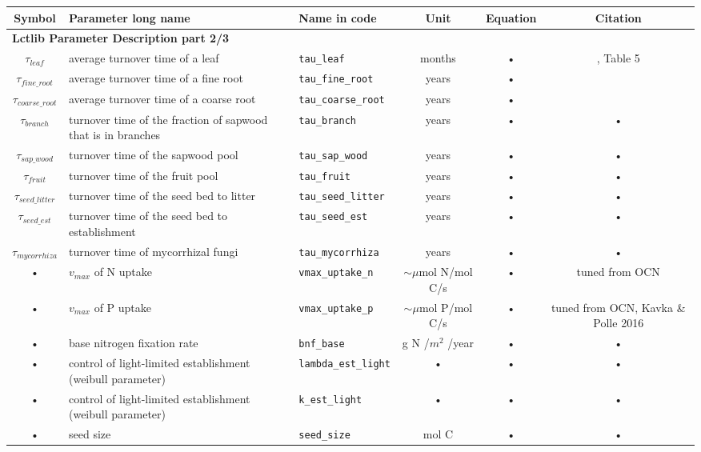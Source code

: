 \begin{table}
\begin{tabularx}{\linewidth}{|c|X|l|c|c|c|} %
\hline 
Symbol & Parameter long name & Name in code & Unit & Equation & Citation \\ 
\hline 

\multicolumn{6}{l}{\bf Lctlib Parameter Description part 2/3}\\
\hline
$\tau_{leaf}$  & average turnover time of a leaf & \texttt{tau\_leaf} & months & • & \cite{Kattge:2011fc}, Table 5 \\
$\tau_{{fine}\_{root}}$ & average turnover time of a fine root & \texttt{tau\_fine\_root} & years & • & \cite{Ahrens:2014gi} \\
$\tau_{{coarse}\_{root}}$ & average turnover time of a coarse root & \texttt{tau\_coarse\_root} & years & • & \cite{Ahrens:2014gi} \\
$\tau_{branch}$ & turnover time of the fraction of sapwood that is in branches & \texttt{tau\_branch} & years & • & • \\
$\tau_{{sap}\_{wood}}$ & turnover time of the sapwood pool & \texttt{tau\_sap\_wood} & years & • & • \\
$\tau_{fruit}$ & turnover time of the fruit pool & \texttt{tau\_fruit} & years & • & • \\
$\tau_{{seed}\_{litter}}$ & turnover time of the seed bed to litter & \texttt{tau\_seed\_litter} & years & • & • \\
$\tau_{{seed}\_{est}}$ & turnover time of the seed bed to establishment & \texttt{tau\_seed\_est} & years & • & • \\
$\tau_{mycorrhiza}$  & turnover time of mycorrhizal fungi & \texttt{tau\_mycorrhiza} & years & • & • \\
 • & $v_{max}$ of N uptake & \texttt{vmax\_uptake\_n} & $\sim\mu$mol N/mol C/s & • & tuned from OCN \\
 • & $v_{max}$ of P uptake & \texttt{vmax\_uptake\_p} & $\sim\mu$mol P/mol C/s & • & tuned from OCN, Kavka \& Polle 2016 \\
 • & base nitrogen fixation rate & \texttt{bnf\_base} & g N /$m^2$ /year & • & • \\
 • & control of light-limited establishment (weibull parameter) & \texttt{lambda\_est\_light} & • & • & • \\
 • & control of light-limited establishment (weibull parameter) & \texttt{k\_est\_light} & • & • & • \\
 • & seed size & \texttt{seed\_size} & mol C & • & • \\

\end{tabularx}
\end{table}
